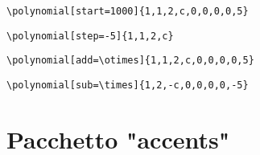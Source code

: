 \begin{center}
\begin{minipage}{.7\textwidth}
\begin{verbatim}
\end{verbatim}
\end{minipage}
\begin{minipage}{.2\textwidth}
\end{minipage}
\begin{minipage}{.6\textwidth}
\begin{verbatim}
\polynomial[start=1000]{1,1,2,c,0,0,0,0,5}
\end{verbatim}
\end{minipage}
\begin{minipage}{.35\textwidth}
\end{minipage}
\begin{minipage}{.7\textwidth}
\begin{verbatim}
\polynomial[step=-5]{1,1,2,c}
\end{verbatim}
\end{minipage}
\begin{minipage}{.2\textwidth}
\end{minipage}
\begin{minipage}{.7\textwidth}
\begin{verbatim}\polynomial[add=\otimes]{1,1,2,c,0,0,0,0,5}
\end{verbatim}
\end{minipage}
\begin{minipage}{.2\textwidth}
\end{minipage}
\begin{minipage}{.7\textwidth}
\begin{verbatim}\polynomial[sub=\times]{1,2,-c,0,0,0,0,-5}
\end{verbatim}
\end{minipage}
\begin{minipage}{.2\textwidth}
\end{minipage}
\end{center}
\section{Pacchetto "accents"}

